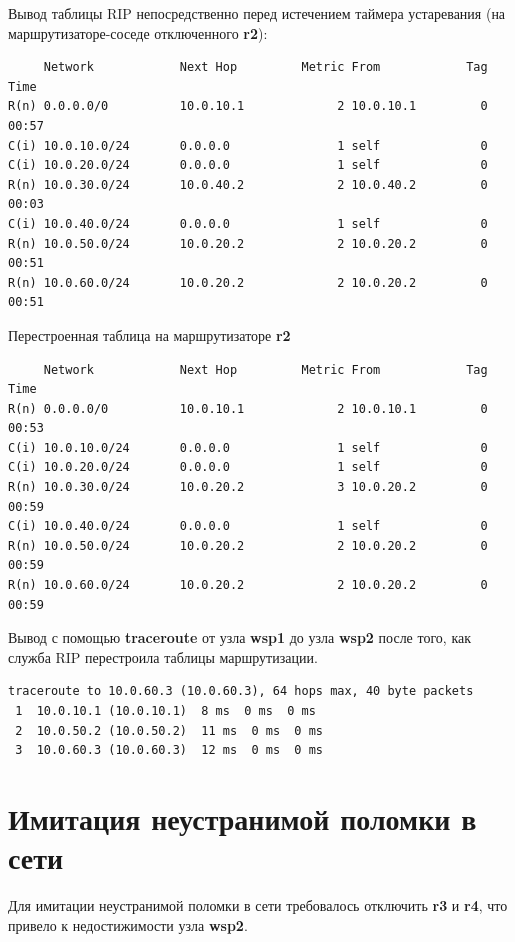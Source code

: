 \documentclass[a4paper,12pt]{article}
\begin{document}
Вывод таблицы RIP непосредственно перед истечением таймера устаревания (на маршрутизаторе-соседе отключенного \textbf{r2}):

\begin{Verbatim}
     Network            Next Hop         Metric From            Tag Time
R(n) 0.0.0.0/0          10.0.10.1             2 10.0.10.1         0 00:57
C(i) 10.0.10.0/24       0.0.0.0               1 self              0
C(i) 10.0.20.0/24       0.0.0.0               1 self              0
R(n) 10.0.30.0/24       10.0.40.2             2 10.0.40.2         0 00:03
C(i) 10.0.40.0/24       0.0.0.0               1 self              0
R(n) 10.0.50.0/24       10.0.20.2             2 10.0.20.2         0 00:51
R(n) 10.0.60.0/24       10.0.20.2             2 10.0.20.2         0 00:51
\end{Verbatim}

Перестроенная таблица на маршрутизаторе \textbf{r2}

\begin{Verbatim}
     Network            Next Hop         Metric From            Tag Time
R(n) 0.0.0.0/0          10.0.10.1             2 10.0.10.1         0 00:53
C(i) 10.0.10.0/24       0.0.0.0               1 self              0
C(i) 10.0.20.0/24       0.0.0.0               1 self              0
R(n) 10.0.30.0/24       10.0.20.2             3 10.0.20.2         0 00:59
C(i) 10.0.40.0/24       0.0.0.0               1 self              0
R(n) 10.0.50.0/24       10.0.20.2             2 10.0.20.2         0 00:59
R(n) 10.0.60.0/24       10.0.20.2             2 10.0.20.2         0 00:59
\end{Verbatim}

Вывод с помощью \textbf{traceroute} от узла \textbf{wsp1} до узла \textbf{wsp2} после того, как служба RIP перестроила таблицы маршрутизации.

\begin{Verbatim}
traceroute to 10.0.60.3 (10.0.60.3), 64 hops max, 40 byte packets
 1  10.0.10.1 (10.0.10.1)  8 ms  0 ms  0 ms
 2  10.0.50.2 (10.0.50.2)  11 ms  0 ms  0 ms
 3  10.0.60.3 (10.0.60.3)  12 ms  0 ms  0 ms
\end{Verbatim}

\section{Имитация неустранимой поломки в сети}

Для имитации неустранимой поломки в сети требовалось отключить \textbf{r3} и \textbf{r4}, что привело к недостижимости узла \textbf{wsp2}.
\end{document}
